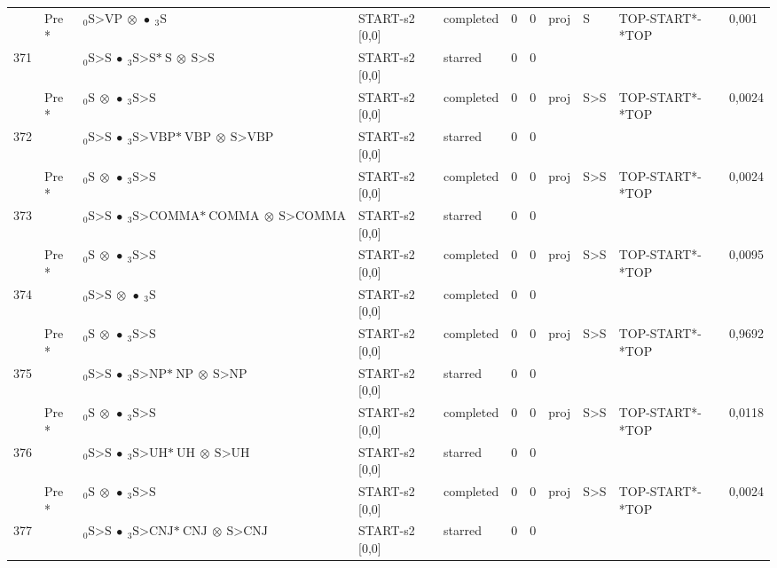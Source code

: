 \documentclass[10pt]{article}
\begin{document}
\begin{longtable}[htbp]{lllllllllll}
 & Pre *& $ {}_0 \textrm{S>VP} \  \otimes \  \bullet \ {}_{3} \textrm{S} $ & START-s2 [0,0] & completed & 0 & 0 & proj & S & TOP-START*-*TOP & 0,001 \\ 
371 & & $ {}_0 \textrm{S>S} \  \bullet \ {}_{3} \textrm{S>S*} \ \textrm{S} \  \otimes \ \textrm{S>S} $ & START-s2 [0,0] & starred & 0 & 0 & & & & \\ 
 & Pre *& $ {}_0 \textrm{S} \  \otimes \  \bullet \ {}_{3} \textrm{S>S} $ & START-s2 [0,0] & completed & 0 & 0 & proj & S>S & TOP-START*-*TOP & 0,0024 \\ 
372 & & $ {}_0 \textrm{S>S} \  \bullet \ {}_{3} \textrm{S>VBP*} \ \textrm{VBP} \  \otimes \ \textrm{S>VBP} $ & START-s2 [0,0] & starred & 0 & 0 & & & & \\ 
 & Pre *& $ {}_0 \textrm{S} \  \otimes \  \bullet \ {}_{3} \textrm{S>S} $ & START-s2 [0,0] & completed & 0 & 0 & proj & S>S & TOP-START*-*TOP & 0,0024 \\ 
373 & & $ {}_0 \textrm{S>S} \  \bullet \ {}_{3} \textrm{S>COMMA*} \ \textrm{COMMA} \  \otimes \ \textrm{S>COMMA} $ & START-s2 [0,0] & starred & 0 & 0 & & & & \\ 
 & Pre *& $ {}_0 \textrm{S} \  \otimes \  \bullet \ {}_{3} \textrm{S>S} $ & START-s2 [0,0] & completed & 0 & 0 & proj & S>S & TOP-START*-*TOP & 0,0095 \\ 
374 & & $ {}_0 \textrm{S>S} \  \otimes \  \bullet \ {}_{3} \textrm{S} $ & START-s2 [0,0] & completed & 0 & 0 & & & & \\ 
 & Pre *& $ {}_0 \textrm{S} \  \otimes \  \bullet \ {}_{3} \textrm{S>S} $ & START-s2 [0,0] & completed & 0 & 0 & proj & S>S & TOP-START*-*TOP & 0,9692 \\ 
375 & & $ {}_0 \textrm{S>S} \  \bullet \ {}_{3} \textrm{S>NP*} \ \textrm{NP} \  \otimes \ \textrm{S>NP} $ & START-s2 [0,0] & starred & 0 & 0 & & & & \\ 
 & Pre *& $ {}_0 \textrm{S} \  \otimes \  \bullet \ {}_{3} \textrm{S>S} $ & START-s2 [0,0] & completed & 0 & 0 & proj & S>S & TOP-START*-*TOP & 0,0118 \\ 
376 & & $ {}_0 \textrm{S>S} \  \bullet \ {}_{3} \textrm{S>UH*} \ \textrm{UH} \  \otimes \ \textrm{S>UH} $ & START-s2 [0,0] & starred & 0 & 0 & & & & \\ 
 & Pre *& $ {}_0 \textrm{S} \  \otimes \  \bullet \ {}_{3} \textrm{S>S} $ & START-s2 [0,0] & completed & 0 & 0 & proj & S>S & TOP-START*-*TOP & 0,0024 \\ 
377 & & $ {}_0 \textrm{S>S} \  \bullet \ {}_{3} \textrm{S>CNJ*} \ \textrm{CNJ} \  \otimes \ \textrm{S>CNJ} $ & START-s2 [0,0] & starred & 0 & 0 & & & & \\ 

\end{longtable}
\end{document}
